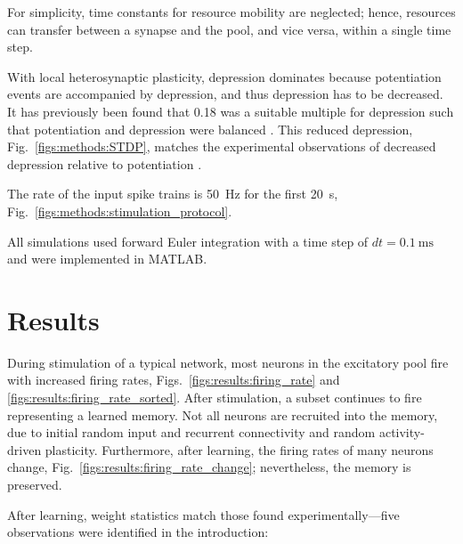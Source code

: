 \documentclass[utf8]{FrontiersinHarvard} %
\begin{document}
For simplicity, time constants for resource mobility are neglected; hence, resources can transfer between a synapse and the pool, and vice versa, within a single time step.

With local heterosynaptic plasticity, depression dominates because potentiation events are accompanied by depression, and thus depression has to be decreased. It has previously been found that \SI{0.18}{} was a suitable multiple for depression such that potentiation and depression were balanced \citep{Humble.2013}. This reduced depression, Fig.~\ref{figs:methods:STDP}, matches the experimental observations of decreased depression relative to potentiation \citep{Bi.1998}.

The rate of the input spike trains is \SI{50}{\hertz} for the first \SI{20}{\second}, Fig.~\ref{figs:methods:stimulation_protocol}.

All simulations used forward Euler integration with a time step of $dt=\SI{0.1}{\milli\second}$ and were implemented in MATLAB.

\section{Results}
During stimulation of a typical network, most neurons in the excitatory pool fire with increased firing rates, Figs.~\ref{figs:results:firing_rate} and \ref{figs:results:firing_rate_sorted}. After stimulation, a subset continues to fire representing a learned memory. Not all neurons are recruited into the memory, due to initial random input and recurrent connectivity and random activity-driven plasticity. Furthermore, after learning, the firing rates of many neurons change, Fig.~\ref{figs:results:firing_rate_change}; nevertheless, the memory is preserved.

After learning, weight statistics match those found experimentally---five observations were identified in the introduction:
\end{document}
